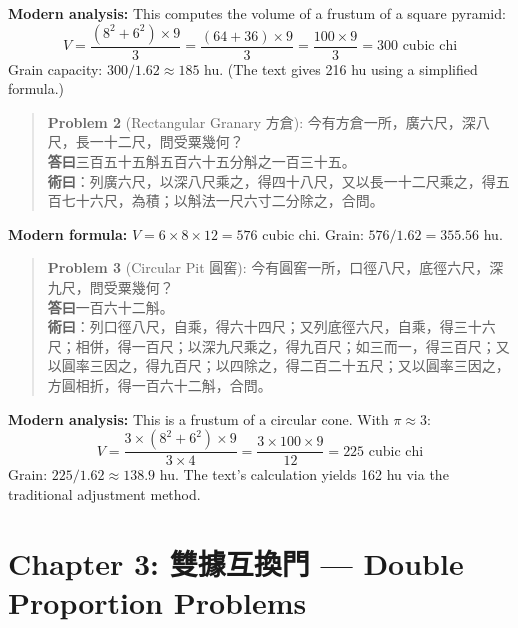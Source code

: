 \documentclass[11pt,a4paper]{article}
\newenvironment{problembox}{%
  \begin{quote}
  \itshape
  \color{problemcolor}
}{%
  \end{quote}
}
\begin{document}
\textbf{Modern analysis:} This computes the volume of a frustum of a square pyramid:
$$V = \frac{(8^2 + 6^2) \times 9}{3} = \frac{(64 + 36) \times 9}{3} = \frac{100 \times 9}{3} = 300 \text{ cubic chi}$$
Grain capacity: $300 / 1.62 \approx 185$ hu. (The text gives 216 hu using a simplified formula.)

\vspace{0.3cm}

\begin{problembox}
\textbf{Problem 2} (Rectangular Granary 方倉): 今有方倉一所，廣六尺，深八尺，長一十二尺，問受粟幾何？\\[0.2cm]
\textbf{答曰}三百五十五斛五百六十五分斛之一百三十五。\\[0.2cm]
\textbf{術曰}：列廣六尺，以深八尺乘之，得四十八尺，又以長一十二尺乘之，得五百七十六尺，為積；以斛法一尺六寸二分除之，合問。
\end{problembox}

\textbf{Modern formula:} $V = 6 \times 8 \times 12 = 576$ cubic chi. Grain: $576 / 1.62 = 355.56$ hu.

\vspace{0.3cm}

\begin{problembox}
\textbf{Problem 3} (Circular Pit 圓窖): 今有圓窖一所，口徑八尺，底徑六尺，深九尺，問受粟幾何？\\[0.2cm]
\textbf{答曰}一百六十二斛。\\[0.2cm]
\textbf{術曰}：列口徑八尺，自乘，得六十四尺；又列底徑六尺，自乘，得三十六尺；相併，得一百尺；以深九尺乘之，得九百尺；如三而一，得三百尺；又以圓率三因之，得九百尺；以四除之，得二百二十五尺；又以圓率三因之，方圓相折，得一百六十二斛，合問。
\end{problembox}

\textbf{Modern analysis:} This is a frustum of a circular cone. With $\pi \approx 3$:
$$V = \frac{3 \times (8^2 + 6^2) \times 9}{3 \times 4} = \frac{3 \times 100 \times 9}{12} = 225 \text{ cubic chi}$$
Grain: $225 / 1.62 \approx 138.9$ hu. The text's calculation yields 162 hu via the traditional adjustment method.

\newpage

\section{Chapter 3: 雙據互換門 --- Double Proportion Problems}
\label{sec:shuangju}
\end{document}
